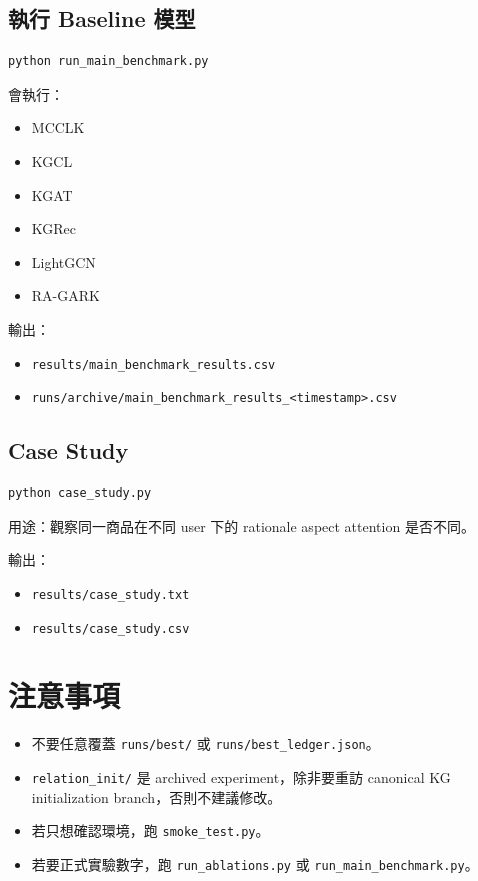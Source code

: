 \documentclass[12pt,a4paper,fontset=none]{ctexart}
\newcommand{\cmd}[1]{\texttt{#1}}
\begin{document}
\subsection{執行 Baseline 模型}

\begin{verbatim}
python run_main_benchmark.py
\end{verbatim}

會執行：

\begin{itemize}
  \item MCCLK
  \item KGCL
  \item KGAT
  \item KGRec
  \item LightGCN
  \item RA-GARK
\end{itemize}

輸出：

\begin{itemize}
  \item \cmd{results/main\_benchmark\_results.csv}
  \item \cmd{runs/archive/main\_benchmark\_results\_<timestamp>.csv}
\end{itemize}

\subsection{Case Study}

\begin{verbatim}
python case_study.py
\end{verbatim}

用途：觀察同一商品在不同 user 下的 rationale aspect attention 是否不同。

輸出：

\begin{itemize}
  \item \cmd{results/case\_study.txt}
  \item \cmd{results/case\_study.csv}
\end{itemize}

\section{注意事項}

\begin{itemize}
  \item 不要任意覆蓋 \cmd{runs/best/} 或 \cmd{runs/best\_ledger.json}。
  \item \cmd{relation\_init/} 是 archived experiment，除非要重訪 canonical KG initialization branch，否則不建議修改。
  \item 若只想確認環境，跑 \cmd{smoke\_test.py}。
  \item 若要正式實驗數字，跑 \cmd{run\_ablations.py} 或 \cmd{run\_main\_benchmark.py}。
\end{itemize}
\end{document}
